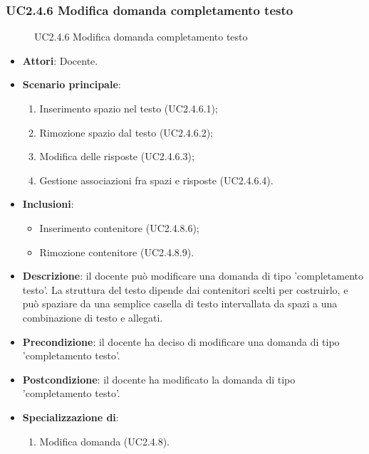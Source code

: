 \subsubsection{UC2.4.6 Modifica domanda completamento testo}
\begin{figure}[H]
\centering
\noindent{}
\caption{UC2.4.6 Modifica domanda completamento testo}
\end{figure}
\begin{itemize}
\item \textbf{Attori}: Docente.
\item \textbf{Scenario principale}:
\begin{enumerate}
\item Inserimento spazio nel testo (UC2.4.6.1);
\item Rimozione spazio dal testo (UC2.4.6.2);
\item Modifica delle risposte  (UC2.4.6.3);
\item Gestione associazioni fra spazi e risposte (UC2.4.6.4).
\end{enumerate}
\item \textbf{Inclusioni}:
\begin{itemize}
\item Inserimento contenitore (UC2.4.8.6);
\item Rimozione contenitore (UC2.4.8.9).
\end{itemize}
\item \textbf{Descrizione}: il docente può modificare una domanda di tipo 'completamento testo'. La struttura del testo dipende dai contenitori scelti per costruirlo, e può spaziare da una semplice casella di testo intervallata da spazi a una combinazione di testo e allegati.
\item \textbf{Precondizione}: il docente ha deciso di modificare una domanda di tipo 'completamento testo'.
\item \textbf{Postcondizione}: il docente ha modificato la domanda di tipo 'completamento testo'.
\item \textbf{Specializzazione di}:
\begin{enumerate}
\item Modifica domanda (UC2.4.8).
\end{enumerate}
\end{itemize}
